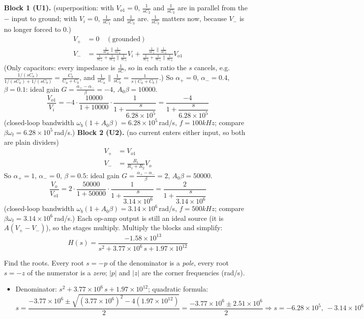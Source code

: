\documentclass[11pt]{article}
\newcommand{\solstep}[2]{\par\medskip{\color{stepc}\textbf{Step #1 --- #2}}\par\nopagebreak}
\begin{document}
\textbf{Block 1 (U1).} (superposition: with $V_{o1}=0$, $\frac{1}{sC_{2}}$ and $\frac{1}{sC_{3}}$ are in parallel from the $-$ input to ground; with $V_{i}=0$, $\frac{1}{sC_{1}}$ and $\frac{1}{sC_{3}}$ are. $\frac{1}{sC_{3}}$ matters now, because $V_-$ is no longer forced to 0.)\begin{align*}
V_+ &= 0 \quad(\text{grounded}) \\
V_- &= \frac{\frac{1}{sC_{2}}\parallel \frac{1}{sC_{3}}}{\frac{1}{sC_{1}}+\frac{1}{sC_{2}}\parallel \frac{1}{sC_{3}}}V_{i} + \frac{\frac{1}{sC_{1}}\parallel \frac{1}{sC_{3}}}{\frac{1}{sC_{2}}+\frac{1}{sC_{1}}\parallel \frac{1}{sC_{3}}}V_{o1}
\end{align*}
(Only capacitors: every impedance is $\frac{1}{sC}$, so in each ratio the $s$ cancels, e.g. $\frac{1/(sC_a)}{1/(sC_a)+1/(sC_b)} = \frac{C_b}{C_a+C_b}$, and $\frac{1}{sC_a}\parallel\frac{1}{sC_b} = \frac{1}{s(C_a+C_b)}$.) So $\alpha_+ = 0$, $\alpha_- = 0.4$, $\beta = 0.1$: ideal gain $G = \frac{\alpha_+-\alpha_-}{\beta} = -4$, $A_0\beta = 10000$.\[
\frac{V_{o1}}{V_{i}} = -4\cdot\frac{10000}{1+10000}\cdot\frac{1}{1+\dfrac{s}{6.28\times 10^{5}}} = \frac{-4}{1+\dfrac{s}{6.28\times 10^{5}}}
\]
(closed-loop bandwidth $\omega_b(1+A_0\beta) = 6.28\times 10^{5}$\,rad/s, $f = 100 kHz$; compare $\beta\omega_t = 6.28\times 10^{5}$\,rad/s.)
\textbf{Block 2 (U2).} (no current enters either input, so both are plain dividers)\begin{align*}
V_+ &= V_{o1} \\
V_- &= \frac{R_{1}}{R_{1}+R_{2}}V_{o}
\end{align*}
So $\alpha_+ = 1$, $\alpha_- = 0$, $\beta = 0.5$: ideal gain $G = \frac{\alpha_+-\alpha_-}{\beta} = 2$, $A_0\beta = 50000$.\[
\frac{V_{o}}{V_{o1}} = 2\cdot\frac{50000}{1+50000}\cdot\frac{1}{1+\dfrac{s}{3.14\times 10^{6}}} = \frac{2}{1+\dfrac{s}{3.14\times 10^{6}}}
\]
(closed-loop bandwidth $\omega_b(1+A_0\beta) = 3.14\times 10^{6}$\,rad/s, $f = 500 kHz$; compare $\beta\omega_t = 3.14\times 10^{6}$\,rad/s.)
Each op-amp output is still an ideal source (it is $A(V_+-V_-)$), so the stages multiply.
Multiply the blocks and simplify:\[
H(s) = \dfrac{-1.58\times 10^{13}}{s^{2} + 3.77\times 10^{6}\,s + 1.97\times 10^{12}}
\]

\solstep{5}{Standard (Bode-ready) form}Find the roots. Every root $s=-p$ of the denominator is a \emph{pole}, every root $s=-z$ of the numerator is a \emph{zero}; $|p|$ and $|z|$ are the corner frequencies (rad/s).
\begin{itemize}[leftmargin=*,itemsep=2pt]
\item Denominator: $s^{2} + 3.77\times 10^{6}\,s + 1.97\times 10^{12}$; quadratic formula:\[
s = \frac{-3.77\times 10^{6} \pm \sqrt{(3.77\times 10^{6})^2 - 4(1.97\times 10^{12})}}{2} = \frac{-3.77\times 10^{6} \pm 2.51\times 10^{6}}{2} \Rightarrow s = -6.28\times 10^{5},\ -3.14\times 10^{6}
\]

\end{itemize}
\end{document}
